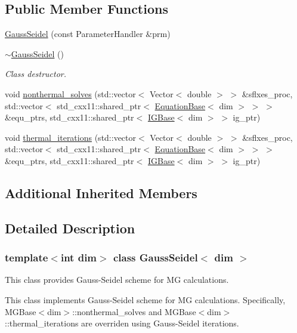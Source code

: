 \subsection*{Public Member Functions}
\begin{DoxyCompactItemize}
\item 
\hyperlink{class_gauss_seidel_a6024b3a7447aa8fb1cd0bd513c1af81e}{Gauss\+Seidel} (const Parameter\+Handler \&prm)
\item 
\hyperlink{class_gauss_seidel_a4d41231183512ec5aab1fa7088c60788}{$\sim$\+Gauss\+Seidel} ()
\begin{DoxyCompactList}\small\item\em Class destructor. \end{DoxyCompactList}\item 
void \hyperlink{class_gauss_seidel_a28fc4ef9150773f587f90951c704c994}{nonthermal\+\_\+solves} (std\+::vector$<$ Vector$<$ double $>$ $>$ \&sflxes\+\_\+proc, std\+::vector$<$ std\+\_\+cxx11\+::shared\+\_\+ptr$<$ \hyperlink{class_equation_base}{Equation\+Base}$<$ dim $>$ $>$ $>$ \&equ\+\_\+ptrs, std\+\_\+cxx11\+::shared\+\_\+ptr$<$ \hyperlink{class_i_g_base}{I\+G\+Base}$<$ dim $>$ $>$ ig\+\_\+ptr)
\item 
void \hyperlink{class_gauss_seidel_a8db6abbdc88413cbf502ac606b415733}{thermal\+\_\+iterations} (std\+::vector$<$ Vector$<$ double $>$ $>$ \&sflxes\+\_\+proc, std\+::vector$<$ std\+\_\+cxx11\+::shared\+\_\+ptr$<$ \hyperlink{class_equation_base}{Equation\+Base}$<$ dim $>$ $>$ $>$ \&equ\+\_\+ptrs, std\+\_\+cxx11\+::shared\+\_\+ptr$<$ \hyperlink{class_i_g_base}{I\+G\+Base}$<$ dim $>$ $>$ ig\+\_\+ptr)
\end{DoxyCompactItemize}
\subsection*{Additional Inherited Members}


\subsection{Detailed Description}
\subsubsection*{template$<$int dim$>$\newline
class Gauss\+Seidel$<$ dim $>$}

This class provides Gauss-\/\+Seidel scheme for MG calculations. 

This class implements Gauss-\/\+Seidel scheme for MG calculations. Specifically, M\+G\+Base$<$dim$>$\+::nonthermal\+\_\+solves and M\+G\+Base$<$dim$>$\+::thermal\+\_\+iterations are overriden using Gauss-\/\+Seidel iterations.

